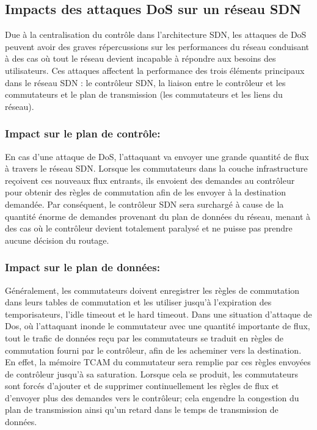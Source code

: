 \subsection{Impacts des attaques DoS sur un réseau SDN}
Due à la centralisation du contrôle dans l’architecture SDN, les attaques de DoS peuvent avoir des graves répercussions sur les performances du réseau conduisant à des cas où tout le réseau devient incapable à répondre aux besoins des utilisateurs. Ces attaques affectent la performance des trois éléments principaux dans le réseau SDN : le contrôleur SDN, la liaison entre le contrôleur et les commutateurs et le plan de transmission (les commutateurs et les liens du réseau).

\subsubsection{Impact sur le plan de contrôle:}
En cas d’une attaque de DoS, l’attaquant va envoyer une grande quantité de flux à travers le réseau SDN. Lorsque les commutateurs dans la couche infrastructure reçoivent ces nouveaux flux entrants, ils envoient des demandes au contrôleur pour obtenir des règles de commutation afin de les envoyer à la destination demandée. Par conséquent, le contrôleur SDN sera surchargé à cause de la quantité énorme de demandes provenant du plan de données du réseau, menant à des cas où le contrôleur devient totalement paralysé et ne puisse pas prendre aucune décision du routage.

\subsubsection{Impact sur le plan de données:}
Généralement, les commutateurs doivent enregistrer les règles de commutation dans leurs tables de commutation et les utiliser jusqu’à l’expiration des temporisateurs, l'idle timeout et le hard timeout. Dans une situation d’attaque de Dos, où l’attaquant inonde le commutateur avec une quantité importante de flux, tout le trafic de données reçu par les commutateurs se traduit en règles de commutation fourni par le contrôleur, afin de les acheminer vers la destination. En effet, la mémoire TCAM du commutateur sera remplie par ces règles envoyées de contrôleur jusqu’à sa saturation. Lorsque cela se produit, les commutateurs sont forcés d’ajouter et de supprimer continuellement les règles de flux et d’envoyer plus des demandes vers le contrôleur; cela engendre la congestion du plan de transmission ainsi qu’un retard dans le temps de transmission de données.

